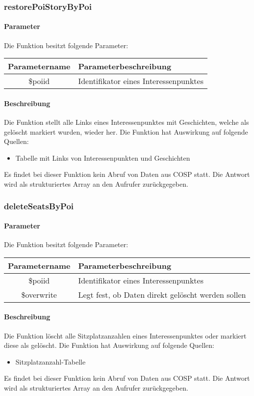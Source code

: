 \subsubsection{restorePoiStoryByPoi}
\paragraph{Parameter} Die Funktion besitzt folgende Parameter:
\begin{table}[H]
	\begin{tabular}{|c|p{11cm}|}
		\hline
		\textbf{Parametername} & \textbf{Parameterbeschreibung} \\ \hline
		\$poiid     & Identifikator eines Interessenpunktes \\ \hline
	\end{tabular}
\end{table}
\paragraph{Beschreibung} Die Funktion stellt alle Links eines Interessenpunktes mit Geschichten, welche als gelöscht markiert wurden, wieder her. Die Funktion hat Auswirkung auf folgende Quellen:
\begin{itemize}
	\item Tabelle mit Links von Interessenpunkten und Geschichten
\end{itemize}
Es findet bei dieser Funktion kein Abruf von Daten aus {\glqq COSP\grqq} statt. Die Antwort wird als strukturiertes Array an den Aufrufer zurückgegeben.
\subsubsection{deleteSeatsByPoi}
\paragraph{Parameter} Die Funktion besitzt folgende Parameter:
\begin{table}[H]
	\begin{tabular}{|c|p{11cm}|}
		\hline
		\textbf{Parametername} & \textbf{Parameterbeschreibung} \\ \hline
		\$poiid     & Identifikator eines Interessenpunktes \\ \hline
		\$overwrite & Legt fest, ob Daten direkt gelöscht werden sollen \\ \hline
	\end{tabular}
\end{table}
\paragraph{Beschreibung} Die Funktion löscht alle Sitzplatzanzahlen eines Interessenpunktes oder markiert diese als gelöscht. Die Funktion hat Auswirkung auf folgende Quellen:
\begin{itemize}
	\item Sitzplatzanzahl-Tabelle
\end{itemize}
Es findet bei dieser Funktion kein Abruf von Daten aus {\glqq COSP\grqq} statt. Die Antwort wird als strukturiertes Array an den Aufrufer zurückgegeben.
